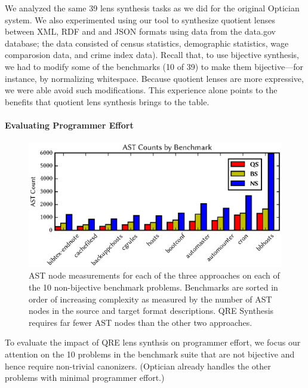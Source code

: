 \documentclass[12pt]{article}
\begin{document}
{We analyzed the same 39 lens synthesis tasks as we did for the original
Optician system.
We also experimented using our tool to synthesize quotient lenses
between XML, RDF and and JSON formats using data from the data.gov
database; the data consisted of census statistics, demographic
statistics, wage comparosion data, and crime index data).
Recall that, to use bijective synthesis, we had to modify some of the 
benchmarks (10 of 39) to make them bijective---for instance, by normalizing whitespace.
Because quotient lenses are more expressive, we were able avoid such
modifications. This
experience alone points to the benefits that quotient lens synthesis
brings to the table. 

\paragraph*{Evaluating Programmer Effort}

\begin{figure}[t]
\centering
\includegraphics{qfigs/asts.eps}
\caption{AST node measurements for each of the three approaches
on each of the 10 non-bijective benchmark problems.
Benchmarks are sorted in order of increasing complexity as measured by
the number of AST nodes in the source and target format descriptions. 
QRE Synthesis requires far fewer AST nodes than the other
two approaches.}
\label{fig:asts}
\end{figure}

To evaluate the impact of QRE lens synthsis on programmer effort,
we focus our attention on the 10 problems in the benchmark suite that
are not bijective and hence require non-trivial canonizers. 
(Optician already handles the other problems with minimal programmer
effort.)

}
\end{document}
